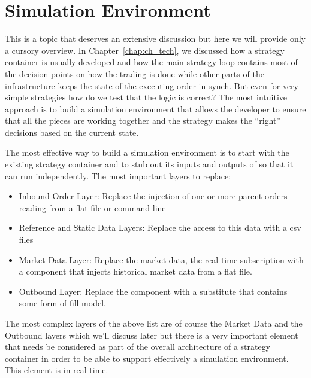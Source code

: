 \section{Simulation Environment}

This is a topic that deserves an extensive discussion but here we will provide only a cursory overview. In Chapter~\ref{chap:ch_tech}, we discussed how a strategy container is usually developed and how the main strategy loop contains most of the decision points on how the trading is done while other parts of the infrastructure keeps the state of the executing order in synch. But even for very simple strategies how do we test that the logic is correct? The most intuitive approach is to build a simulation environment that allows the developer to ensure that all the pieces are working together and the strategy makes the ``right'' decisions based on the current state. 


The most effective way to build a simulation environment is to start with the existing strategy container and to stub out its inputs and outputs of so that it can run independently.  The most important layers to replace:
\begin{itemize}
\item Inbound Order Layer: Replace the injection of one or more parent orders reading from a flat file or command line
\item Reference and Static Data Layers: Replace the access to this data with a csv files
\item Market Data Layer: Replace the market data, the real-time subscription with a component that injects historical market data from a flat file.
\item Outbound Layer: Replace the component with a substitute that contains some form of fill model.
\end{itemize}

The most complex layers of the above list are of course the Market Data and the Outbound layers which we'll discuss later but there is a very important element that needs  be considered as part of the overall architecture of a strategy container in order to be able to support effectively a simulation environment. This element is in real time.


